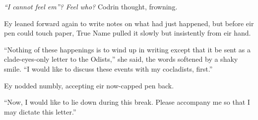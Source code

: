 \emph{``I cannot feel em''? Feel who?} Codrin thought, frowning.

Ey leaned forward again to write notes on what had just happened, but before eir pen could touch paper, True Name pulled it slowly but insistently from eir hand.

``Nothing of these happenings is to wind up in writing except that it be sent as a clade-eyes-only letter to the Odists,'' she said, the words softened by a shaky smile. ``I would like to discuss these events with my cocladists, first.''

Ey nodded numbly, accepting eir now-capped pen back.

``Now, I would like to lie down during this break. Please accompany me so that I may dictate this letter.''
